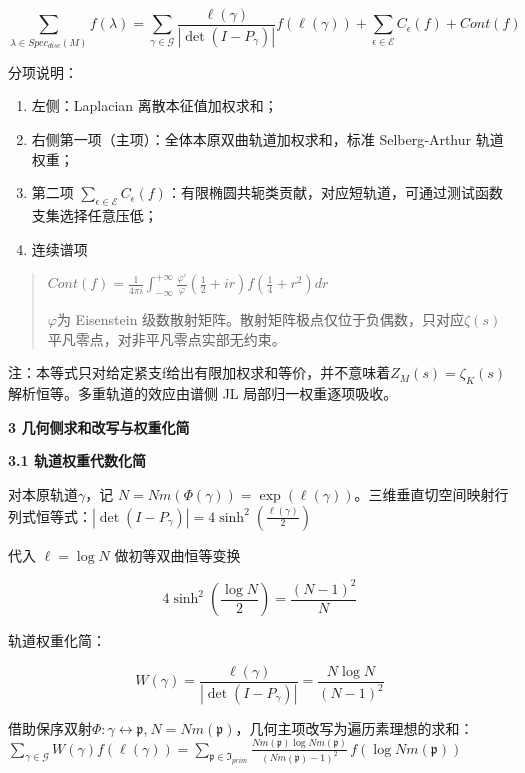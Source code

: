 \documentclass[11pt,a4paper]{ctexart}
\begin{document}
\[\sum_{\lambda \in Spec_{disc}(M)}^{}f(\lambda) = \sum_{\gamma \in \mathcal{G}}^{}\frac{\ell\left(\gamma\right)}{\left| \det\left( I - P_{\gamma} \right) \right|}f\left( \ell\left(\gamma\right) \right) + \sum_{\epsilon \in \mathcal{E}}^{}C_{\epsilon}(f) + Cont(f)\]

分项说明：

\begin{enumerate}
\def\labelenumi{\arabic{enumi}.}
\item
  左侧：Laplacian 离散本征值加权求和；
\item
  右侧第一项（主项）：全体本原双曲轨道加权求和，标准 Selberg‑Arthur
  轨道权重；
\item
  第二项
  \(\sum_{\epsilon \in \mathcal{E}}^{}C_{\epsilon}(f)\)：有限椭圆共轭类贡献，对应短轨道，可通过测试函数支集选择任意压低；
\item
  连续谱项
\end{enumerate}

\begin{quote}
\(Cont(f) = \frac{1}{4\pi i}\int_{- \infty}^{+ \infty}\frac{\varphi'}{\varphi}\left( \frac{1}{2} + ir \right)f\left( \frac{1}{4} + r^{2} \right)dr\)

\(\varphi\)为 Eisenstein
级数散射矩阵。散射矩阵极点仅位于负偶数，只对应\(\zeta(s)\)平凡零点，对非平凡零点实部无约束。
\end{quote}

注：本等式只对给定紧支f给出有限加权求和等价，并不意味着\(Z_{M}(s) = \zeta_{K}(s)\)解析恒等。多重轨道的效应由谱侧
JL 局部归一权重逐项吸收。

\textbf{3 几何侧求和改写与权重化简}

\textbf{3.1 轨道权重代数化简}

对本原轨道\(\gamma\)，记
\(N = Nm\left( \Phi(\gamma) \right) = \exp\left( \ell\left(\gamma\right) \right)\)。三维垂直切空间映射行列式恒等式：\(\left| \det\left( I - P_{\gamma} \right) \right| = 4\sinh^{2}\left( \frac{\ell\left(\gamma\right)}{2} \right)\)

代入 \(\ell{=}\log N\) 做初等双曲恒等变换

\[4\sinh^{2}\left( \frac{\log N}{2} \right) = \frac{(N - 1)^{2}}{N}\]

轨道权重化简：

\[W(\gamma) = \frac{\ell\left(\gamma\right)}{\left| \det\left( I - P_{\gamma} \right) \right|} = \frac{N\log N}{(N - 1)^{2}}\]

借助保序双射\(\Phi:\gamma \leftrightarrow \mathfrak{p}\),\(\ N = Nm\left( \mathfrak{p} \right)\)，几何主项改写为遍历素理想的求和：
\(\sum_{\gamma \in \mathcal{G}}^{}W(\gamma)f\left( \ell\left(\gamma\right) \right) = \sum_{\mathfrak{p} \in \mathfrak{I}_{prim}}^{}\frac{Nm\left( \mathfrak{p} \right)\log{Nm}\left( \mathfrak{p} \right)}{\left( Nm\left( \mathfrak{p} \right) - 1 \right)^{2}}\, f\left( \log{Nm}\left( \mathfrak{p} \right) \right)\)
\end{document}
